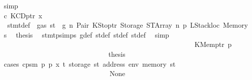 \begin{isabellebody}
\ simp\isanewline
\ \ \ \ \ \ \ \ \ \ \ \ \ \ \ \ \ \ \ \ \ \ \ \ \ \ \isamarkupfalse%
\isanewline
\ \ \ \ \ \ \ \ \ \ \ \ \ \ \ \ \ \ \ \ \ \ \ \ \ \ \ \ \isamarkupfalse%
\ c{}{\isacharcolon}{\kern0pt}\ {\isacharparenleft}{\kern0pt}KCDptr\ x{}{\isacharparenright}{\kern0pt}\isanewline
\ \ \ \ \ \ \ \ \ \ \ \ \ \ \ \ \ \ \ \ \ \ \ \ \ \ \ \ \isamarkupfalse%
\ {}{\isacharparenleft}{\kern0pt}{}{\isacharparenright}{\kern0pt}\ stmt{\isacharunderscore}{\kern0pt}def\ {\isacharbackquoteopen}{\isasymnot}\ gas\ st\ {\isasymle}\ g{\isacharbackquoteclose}\ n\ Pair\ KStoptr\ Storage\ STArray\ n{}\ p{}\ LStackloc\ Memory\ s{}\ \isamarkupfalse%
\ {\isacharquery}{\kern0pt}thesis\ \isamarkupfalse%
\ stmt{\isachardot}{\kern0pt}psimps{\isacharparenleft}{\kern0pt}{}{\isacharparenright}{\kern0pt}\ g{\isacharunderscore}{\kern0pt}def\ st{\isacharprime}{\kern0pt}{\isacharunderscore}{\kern0pt}def\ st{\isacharprime}{\kern0pt}{\isacharprime}{\kern0pt}{\isacharunderscore}{\kern0pt}def\ st{\isacharprime}{\kern0pt}{\isacharprime}{\kern0pt}{\isacharprime}{\kern0pt}{\isacharunderscore}{\kern0pt}def\ \isamarkupfalse%
\ simp\isanewline
\ \ \ \ \ \ \ \ \ \ \ \ \ \ \ \ \ \ \ \ \ \ \ \ \ \ \isamarkupfalse%
\isanewline
\ \ \ \ \ \ \ \ \ \ \ \ \ \ \ \ \ \ \ \ \ \ \ \ \ \ \ \ \isamarkupfalse%
\ {\isacharparenleft}{\kern0pt}KMemptr\ p{\isacharprime}{\kern0pt}{\isacharparenright}{\kern0pt}\isanewline
\ \ \ \ \ \ \ \ \ \ \ \ \ \ \ \ \ \ \ \ \ \ \ \ \ \ \ \ \isamarkupfalse%
\ \isamarkupfalse%
\ {\isacharquery}{\kern0pt}thesis\isanewline
\ \ \ \ \ \ \ \ \ \ \ \ \ \ \ \ \ \ \ \ \ \ \ \ \ \ \ \ \isamarkupfalse%
\ {\isacharparenleft}{\kern0pt}cases\ {\isachardoublequoteopen}cps{}m\ p\ p{\isacharprime}{\kern0pt}\ x\ t\ {\isacharparenleft}{\kern0pt}storage\ st{\isacharprime}{\kern0pt}{\isacharprime}{\kern0pt}{\isacharprime}{\kern0pt}\ {\isacharparenleft}{\kern0pt}address\ env{\isacharparenright}{\kern0pt}{\isacharparenright}{\kern0pt}\ {\isacharparenleft}{\kern0pt}memory\ st{\isacharprime}{\kern0pt}{\isacharprime}{\kern0pt}{\isacharprime}{\kern0pt}{\isacharparenright}{\kern0pt}{\isachardoublequoteclose}{\isacharparenright}{\kern0pt}\isanewline
\ \ \ \ \ \ \ \ \ \ \ \ \ \ \ \ \ \ \ \ \ \ \ \ \ \ \ \ \ \ \isamarkupfalse%
\ None\isanewline
\ \ \ \ \ \ \ \ \ \ \ \ \ \ \ \ \ \ \ \ \ \ \ \ \ \ \ \ \ \ \isamarkupfalse%

\end{isabellebody}

